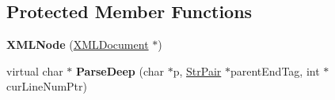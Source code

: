 \subsection*{Protected Member Functions}
\begin{DoxyCompactItemize}
\item 
{\bfseries X\+M\+L\+Node} (\hyperlink{classtinyxml2_1_1XMLDocument}{X\+M\+L\+Document} $\ast$)\hypertarget{classtinyxml2_1_1XMLNode_a29868df6ca383d574f584dfdd15105b6}{}\label{classtinyxml2_1_1XMLNode_a29868df6ca383d574f584dfdd15105b6}

\item 
virtual char $\ast$ {\bfseries Parse\+Deep} (char $\ast$p, \hyperlink{classtinyxml2_1_1StrPair}{Str\+Pair} $\ast$parent\+End\+Tag, int $\ast$cur\+Line\+Num\+Ptr)\hypertarget{classtinyxml2_1_1XMLNode_a916e498914baecbc9a1f012352ef7c69}{}\label{classtinyxml2_1_1XMLNode_a916e498914baecbc9a1f012352ef7c69}

\end{DoxyCompactItemize}
